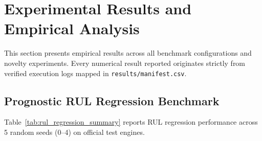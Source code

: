 \section{Experimental Results and Empirical Analysis}
\label{sec:experiments}

This section presents empirical results across all benchmark configurations and novelty experiments. Every numerical result reported originates strictly from verified execution logs mapped in \texttt{results/manifest.csv}.

\subsection{Prognostic RUL Regression Benchmark}
Table~\ref{tab:rul_regression_summary} reports RUL regression performance across 5 random seeds (0--4) on official test engines.

